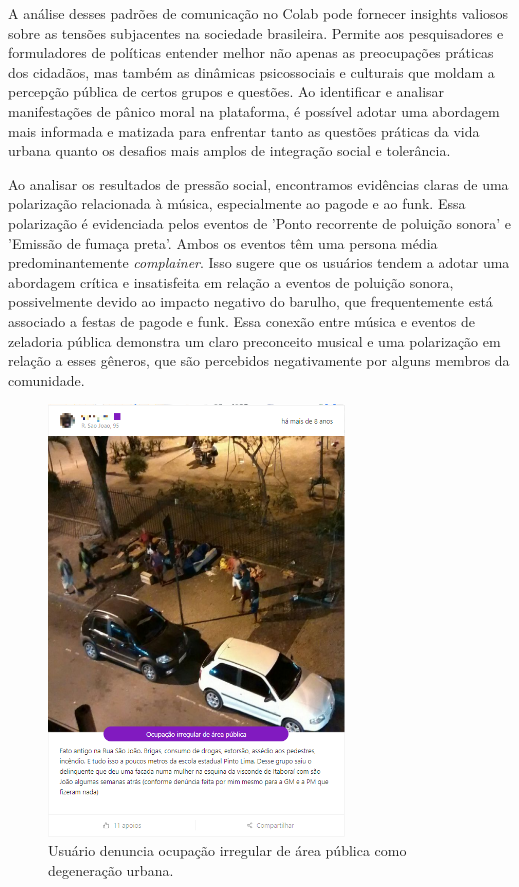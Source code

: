 A análise desses padrões de comunicação no Colab pode fornecer insights valiosos sobre as tensões subjacentes na sociedade brasileira. Permite aos pesquisadores e formuladores de políticas entender melhor não apenas as preocupações práticas dos cidadãos, mas também as dinâmicas psicossociais e culturais que moldam a percepção pública de certos grupos e questões. Ao identificar e analisar manifestações de pânico moral na plataforma, é possível adotar uma abordagem mais informada e matizada para enfrentar tanto as questões práticas da vida urbana quanto os desafios mais amplos de integração social e tolerância.

Ao analisar os resultados de pressão social, encontramos evidências claras de uma polarização relacionada à música, especialmente ao pagode e ao funk. Essa polarização é evidenciada pelos eventos de 'Ponto recorrente de poluição sonora' e 'Emissão de fumaça preta'. Ambos os eventos têm uma persona média predominantemente \textit{complainer}. Isso sugere que os usuários tendem a adotar uma abordagem crítica e insatisfeita em relação a eventos de poluição sonora, possivelmente devido ao impacto negativo do barulho, que frequentemente está associado a festas de pagode e funk. Essa conexão entre música e eventos de zeladoria pública demonstra um claro preconceito musical e uma polarização em relação a esses gêneros, que são percebidos negativamente por alguns membros da comunidade.

\begin{figure}[htb]
	\centering
	\includegraphics[width=0.7\textwidth]{images/colab_posts_moral_panic.png}
	\caption{Usuário denuncia ocupação irregular de área pública como degeneração urbana.}
	\label{fig:colab_posts_moral_panic}
\end{figure}

